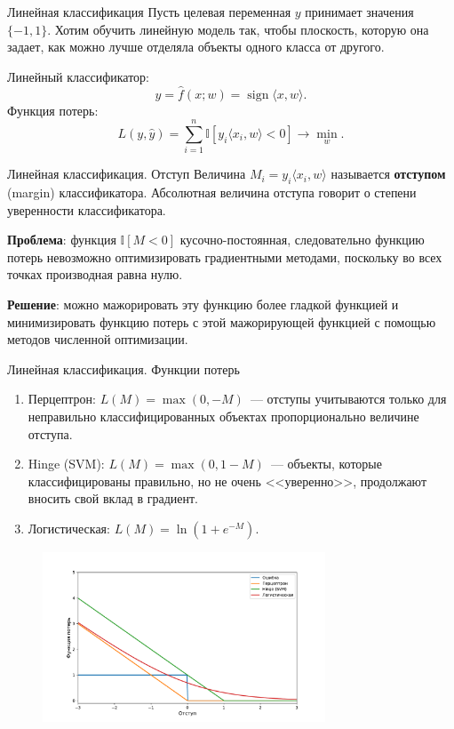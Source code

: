 \documentclass[notheorems, handout]{beamer}
\begin{document}
\begin{frame}{Линейная классификация}
	Пусть целевая переменная $y$ принимает значения $\{-1, 1\}$. Хотим обучить линейную модель так, чтобы плоскость, которую она задает, как можно лучше отделяла объекты одного класса от другого.\medskip

	Линейный классификатор:
	\[
		\hat y = \hat f(x; w) = \operatorname{sign} \langle x, w\rangle.
	\]
	Функция потерь:
	\[
		L(y, \hat{y}) = \sum_{i=1}^{n}\mathbb{I}[y_i \langle x_i, w\rangle < 0] \longrightarrow \min_{w}.
	\]
\end{frame}

\begin{frame}{Линейная классификация. Отступ}
	Величина $M_i=y_i \langle x_i, w\rangle$ называется \textbf{отступом} (margin) классификатора. Абсолютная величина отступа говорит о степени уверенности классификатора.\medskip

	\textbf{Проблема}: функция $\mathbb{I}[M < 0]$ кусочно-постоянная, следовательно функцию потерь невозможно оптимизировать градиентными методами, поскольку во всех точках производная равна нулю.\medskip

	\textbf{Решение}: можно мажорировать эту функцию более гладкой функцией и минимизировать функцию потерь с этой мажорирующей функцией с помощью методов численной оптимизации.
\end{frame}

\begin{frame}{Линейная классификация. Функции потерь}
	\begin{enumerate}
		\item Перцептрон: $L(M) = \max(0, -M)$~--- отступы учитываются только для неправильно классифицированных объектах пропорционально величине отступа.
		\item Hinge (SVM): $L(M) = \max(0, 1-M)$~--- объекты, которые классифицированы правильно, но не очень <<уверенно>>, продолжают вносить свой вклад в градиент.
		\item Логистическая: $L(M) = \ln\left(1+e^{-M}\right)$.
	\end{enumerate}
	\begin{figure}
		\includegraphics[width=0.75\textwidth]{img/loss_major.pdf}
	\end{figure}
\end{frame}
\end{document}
